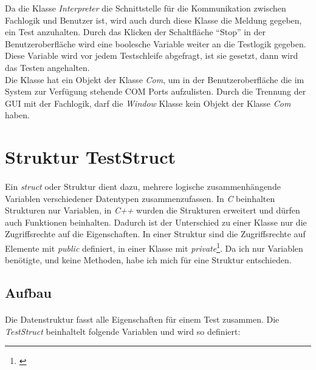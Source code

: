 Da die Klasse \textit{Interpreter} die Schnittstelle für die Kommunikation zwischen Fachlogik und Benutzer ist, wird auch durch diese Klasse die Meldung gegeben, ein Test anzuhalten. Durch das Klicken der Schaltfläche "`Stop"' in der Benutzeroberfläche wird eine boolesche Variable weiter an die Testlogik gegeben. Diese Variable wird vor jedem Testschleife abgefragt, ist sie gesetzt, dann wird das Testen angehalten.\\

Die Klasse hat ein Objekt der Klasse \textit{Com}, um in der Benutzeroberfläche die im System zur Verfügung stehende COM Ports aufzulisten. Durch die Trennung der GUI mit der Fachlogik, darf die \textit{Window} Klasse kein Objekt der Klasse \textit{Com} haben.\\



\newpage

\section{Struktur TestStruct}\label{TestStruct}
\paragraph{}
Ein \textit{struct} oder Struktur dient dazu, mehrere logische zusammenhängende Variablen verschiedener Datentypen zusammenzufassen. In \textit{C} beinhalten Strukturen nur Variablen, in \textit{C++} wurden die Strukturen erweitert und dürfen auch Funktionen beinhalten. Dadurch ist der Unterschied zu einer Klasse nur die Zugriffsrechte auf die Eigenschaften. In einer Struktur sind die Zugriffsrechte auf Elemente mit  \textit{public} definiert, in einer Klasse mit \textit{private}\footnote{\cite{VisualC++}}. Da ich nur Variablen benötigte, und keine Methoden, habe ich mich für eine Struktur entschieden.


\subsection{Aufbau}
\paragraph{}
Die Datenstruktur fasst alle Eigenschaften für einem Test zusammen. Die \textit{TestStruct} beinhaltelt folgende Variablen und wird so definiert:\\

